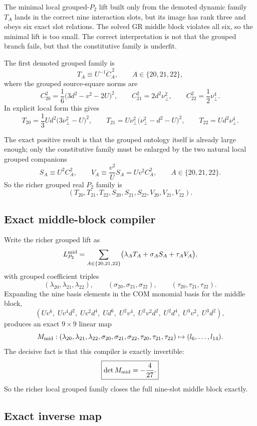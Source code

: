 \documentclass[11pt]{article}
\begin{document}
The minimal local grouped-$P_2$ lift built only from the demoted dynamic family $T_A$ lands in the correct nine interaction slots, but its image has rank three and obeys six exact slot relations. The solved GR middle block violates all six, so the minimal lift is too small. The correct interpretation is not that the grouped branch fails, but that the constitutive family is underfit.

The first demoted grouped family is
\[
T_A \equiv U^{-1}\dot C_A^{\,2},
\qquad A\in\{20,21,22\},
\]
where the grouped source-square norms are
\[
C_{20}^2=\frac16\bigl(3d^2-v^2-2U\bigr)^2,
\qquad
C_{21}^2=2d^2\nu_\perp^2,
\qquad
C_{22}^2=\frac12\nu_\perp^4.
\]
In explicit local form this gives
\[
T_{20}=\frac13 U d^2\bigl(3\nu_\perp^2-U\bigr)^2,
\qquad
T_{21}=U\nu_\perp^2\bigl(\nu_\perp^2-d^2-U\bigr)^2,
\qquad
T_{22}=U d^2\nu_\perp^4.
\]

The exact positive result is that the grouped ontology itself is already large enough; only the constitutive family must be enlarged by the two natural local grouped companions
\[
S_A\equiv U^2 C_A^2,
\qquad
V_A\equiv \frac{v^2}{U}S_A=Uv^2C_A^2,
\qquad A\in\{20,21,22\}.
\]
So the richer grouped real $P_2$ family is
\[
(T_{20},T_{21},T_{22},S_{20},S_{21},S_{22},V_{20},V_{21},V_{22}).
\]

\subsection{Exact middle-block compiler}
\label{app:richer_grouped_p2_compiler_inverse_map:compiler}

Write the richer grouped lift as
\[
L_{P_2}^{\rm mid}
=
\sum_{A\in\{20,21,22\}}
\bigl(\lambda_A T_A+\sigma_A S_A+\tau_A V_A\bigr),
\]
with grouped coefficient triples
\[
(\lambda_{20},\lambda_{21},\lambda_{22}),
\qquad
(\sigma_{20},\sigma_{21},\sigma_{22}),
\qquad
(\tau_{20},\tau_{21},\tau_{22}).
\]
Expanding the nine basis elements in the COM monomial basis for the middle block,
\[
(Uv^6,
\;Uv^4d^2,
\;Uv^2d^4,
\;Ud^6,
\;U^2v^4,
\;U^2v^2d^2,
\;U^2d^4,
\;U^3v^2,
\;U^3d^2),
\]
produces an exact $9\times 9$ linear map
\[
M_{\rm mid}:
(\lambda_{20},\lambda_{21},\lambda_{22},
\sigma_{20},\sigma_{21},\sigma_{22},
\tau_{20},\tau_{21},\tau_{22})
\mapsto
(l_6,\dots,l_{14}).
\]
The decisive fact is that this compiler is exactly invertible:
\[
\boxed{\det M_{\rm mid}=-\frac{4}{27}.}
\]
So the richer local grouped family closes the full nine-slot middle block exactly.

\subsection{Exact inverse map}
\label{app:richer_grouped_p2_compiler_inverse_map:inverse}
\end{document}
